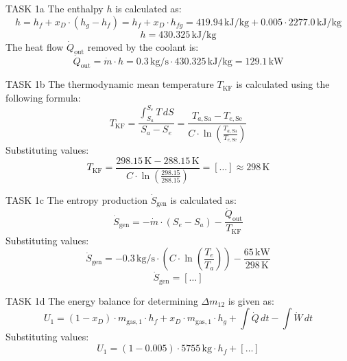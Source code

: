 TASK 1a  
The enthalpy \( h \) is calculated as:  
\[
h = h_f + x_D \cdot (h_g - h_f) = h_f + x_D \cdot h_{fg} = 419.94 \, \text{kJ/kg} + 0.005 \cdot 2277.0 \, \text{kJ/kg}
\]  
\[
h = 430.325 \, \text{kJ/kg}
\]  
The heat flow \( \dot{Q}_{\text{out}} \) removed by the coolant is:  
\[
\dot{Q}_{\text{out}} = \dot{m} \cdot h = 0.3 \, \text{kg/s} \cdot 430.325 \, \text{kJ/kg} = 129.1 \, \text{kW}
\]  

TASK 1b  
The thermodynamic mean temperature \( T_{\text{KF}} \) is calculated using the following formula:  
\[
T_{\text{KF}} = \frac{\int_{S_a}^{S_e} T \, dS}{S_a - S_e} = \frac{T_{a,\text{Sa}} - T_{e,\text{Se}}}{C \cdot \ln \left( \frac{T_{a,\text{Sa}}}{T_{e,\text{Se}}} \right)}
\]  
Substituting values:  
\[
T_{\text{KF}} = \frac{298.15 \, \text{K} - 288.15 \, \text{K}}{C \cdot \ln \left( \frac{298.15}{288.15} \right)} = [\ldots] \approx 298 \, \text{K}
\]  

TASK 1c  
The entropy production \( \dot{S}_{\text{gen}} \) is calculated as:  
\[
\dot{S}_{\text{gen}} = -\dot{m} \cdot (S_e - S_a) - \frac{\dot{Q}_{\text{out}}}{T_{\text{KF}}}
\]  
Substituting values:  
\[
\dot{S}_{\text{gen}} = -0.3 \, \text{kg/s} \cdot (C \cdot \ln \left( \frac{T_e}{T_a} \right)) - \frac{65 \, \text{kW}}{298 \, \text{K}}
\]  
\[
\dot{S}_{\text{gen}} = [\ldots]
\]  

TASK 1d  
The energy balance for determining \( \Delta m_{12} \) is given as:  
\[
U_1 = (1 - x_D) \cdot m_{\text{gas},1} \cdot h_f + x_D \cdot m_{\text{gas},1} \cdot h_g + \int \dot{Q} \, dt - \int \dot{W} \, dt
\]  
Substituting values:  
\[
U_1 = (1 - 0.005) \cdot 5755 \, \text{kg} \cdot h_f + [\ldots]
\]